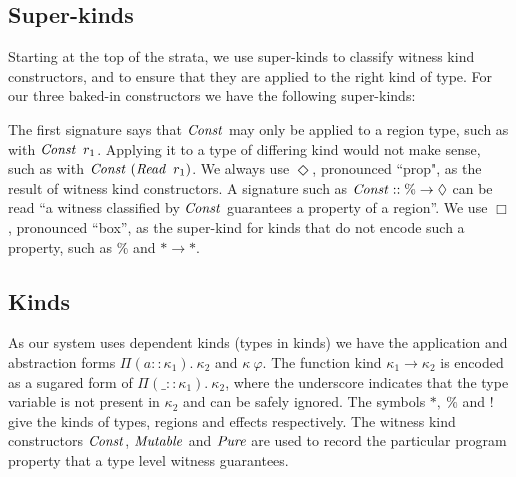 \clearpage{}
\subsection{Super-kinds}
Starting at the top of the strata, we use super-kinds to classify witness kind constructors, and to ensure that they are applied to the right kind of type. For our three baked-in constructors we have the following super-kinds:

\code{
	$\iConst$	& $::$ & $\% \to \Diamond$ 	\\
	$\iMutable$	& $::$ & $\% \to \Diamond$ 	\\
	$\iPure$	& $::$ & $\ ! \: \to \Diamond$ 	\\
}

The first signature says that $\iConst$ may only be applied to a region type, such as with $\operatorname{\mathit{Const}} \ r_1$. Applying it to a type of differing kind would not make sense, such as with $\operatorname{\mathit{Const}} \ (\operatorname{\mathit{Read}} \ r_1)$. We always use $\Diamond$, pronounced ``prop", as the result of witness kind constructors. A signature such as $\operatorname{\mathit{Const}} :: \% \to \Diamond$ can be read ``a witness classified by $\iConst$ guarantees a property of a region''. We use $\Box$, pronounced ``box'', as the super-kind for kinds that do not encode such a property, such as $\%$ and $* \to *$.

\bigskip
\subsection{Kinds}
As our system uses dependent kinds (types in kinds) we have the application and abstraction forms \mbox{$\Pi(a :: \kappa_1) . \ \kappa_2$} and $\kappa \ \varphi$. The function kind $\kappa_1 \to \kappa_2$ is encoded as a sugared form of $\Pi( \_ :: \kappa_1) . \ \kappa_2$, where the underscore indicates that the type variable is not present in $\kappa_2$ and can be safely ignored. The symbols $*, \ \%$ and $!$ give the kinds of types, regions and effects respectively. The witness kind constructors $\iConst$, $\iMutable$ and $\iPure$ are used to record the particular program property that a type level witness guarantees. 
